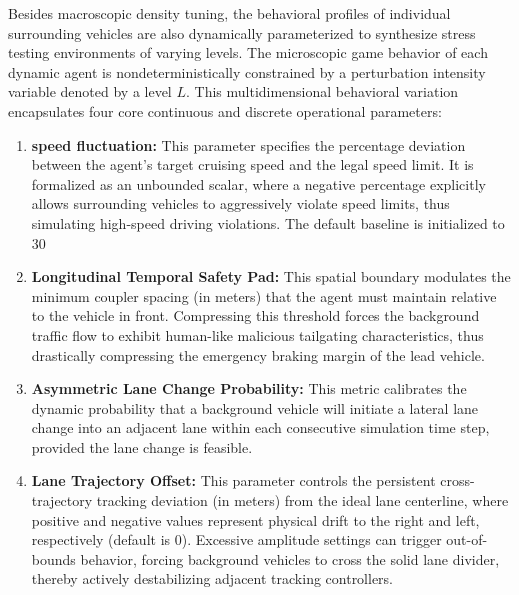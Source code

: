     Besides macroscopic density tuning, the behavioral profiles of individual surrounding vehicles are also dynamically parameterized to synthesize stress testing environments of varying levels. The microscopic game behavior of each dynamic agent is nondeterministically constrained by a perturbation intensity variable denoted by a level $L$. This multidimensional behavioral variation encapsulates four core continuous and discrete operational parameters:
    
    \begin{enumerate}
    \item \textbf{speed fluctuation:} This parameter specifies the percentage deviation between the agent's target cruising speed and the legal speed limit. It is formalized as an unbounded scalar, where a negative percentage explicitly allows surrounding vehicles to aggressively violate speed limits, thus simulating high-speed driving violations. The default baseline is initialized to 30%
    
    \item \textbf{Longitudinal Temporal Safety Pad:} This spatial boundary modulates the minimum coupler spacing (in meters) that the agent must maintain relative to the vehicle in front. Compressing this threshold forces the background traffic flow to exhibit human-like malicious tailgating characteristics, thus drastically compressing the emergency braking margin of the lead vehicle.
    
    \item \textbf{Asymmetric Lane Change Probability:} This metric calibrates the dynamic probability that a background vehicle will initiate a lateral lane change into an adjacent lane within each consecutive simulation time step, provided the lane change is feasible.
    
    \item \textbf{Lane Trajectory Offset:} This parameter controls the persistent cross-trajectory tracking deviation (in meters) from the ideal lane centerline, where positive and negative values represent physical drift to the right and left, respectively (default is 0). Excessive amplitude settings can trigger out-of-bounds behavior, forcing background vehicles to cross the solid lane divider, thereby actively destabilizing adjacent tracking controllers.
    \end{enumerate}

